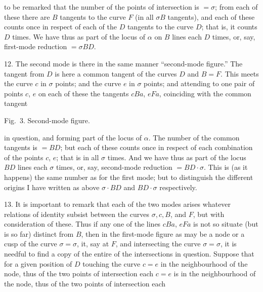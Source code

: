 \documentclass[11pt,a4paper]{article}
\theoremstyle{plain}
\theoremstyle{definition}
\begin{document}
to be remarked that the number of the points of intersection is $=\sigma$; from each of
these there are $B$ tangents to the curve $F$ (in all $\sigma B$ tangents), and each of
these counts once in respect of each of the $D$ tangents to the curve $D$; that is, it
counts $D$ times.  We have thus as part of the locus of $\alpha$ on $B$ lines each $D$ times,
or, say, first-mode reduction $=\sigma BD$.

12. The second mode is there in the same manner ``second-mode figure.''  The
tangent from $D$ is here a common tangent of the curves $D$ and $B=F$.  This meets
the curve $c$ in $\sigma$ points; and the curve $e$ in $\sigma$ points; and attending to one pair
of points $c$, $e$ on each of these the tangents $cBa$, $eFa$, coinciding with the common tangent

\begin{center}
Fig.\ 3.  Second-mode figure.\\
\end{center}

in question, and forming part of the locus of $\alpha$.  The number of the common tangents
is $=BD$; but each of these counts once in respect of each combination of the points
$c$, $e$; that is in all $\sigma$ times.  And we have thus as part of the locus $BD$ lines each
$\sigma$ times, or, say, second-mode reduction $=BD\cdot \sigma$.  This is (as it happens) the
same number as for the first mode; but to distinguish the different origins I have
written as above $\sigma\cdot BD$ and $BD\cdot \sigma$ respectively.

13. It is important to remark that each of the two modes arises whatever
relations of identity subsist between the curves $\sigma, c, B$, and $F$, but with consideration of these.  Thus if any one of the lines $cBa$, $eFa$ is not so situate (but is so far) distinct
from $B$, then in the first-mode figure as may be a node or a cusp of the curve $\sigma=\sigma$,
it, say at $F$, and intersecting the curve $\sigma=\sigma$, it is needful to find a copy of the entire
of the intersections in question.  Suppose that for a given position of $D$ touching the curve
$c=e$ in the neighbourhood of the node, thus of the two points of intersection each
$c=e$ is in the neighbourhood of the node, thus of the two points of intersection each
\end{document}
